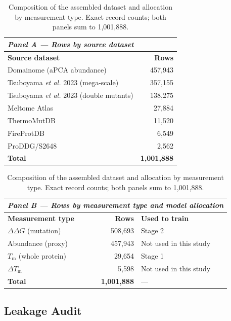 \documentclass[journal,article,submit,moreauthors]{Definitions/mdpi}
\newcommand{\ddg}{\ensuremath{\Delta\Delta G}}
\newcommand{\Tm}{\ensuremath{T_\mathrm{m}}}
\newcommand{\dtm}{\ensuremath{\Delta T_\mathrm{m}}}
\begin{document}
\begin{table}[H]
\caption{Composition of the assembled dataset and allocation by measurement type. Exact
record counts; both panels sum to 1{,}001{,}888.}
\label{tab:data}
\begin{tabular}{lr}
\toprule
\multicolumn{2}{l}{\textit{Panel A --- Rows by source dataset}}\\
\midrule
\textbf{Source dataset} & \textbf{Rows}\\
\midrule
Domainome (aPCA abundance)              & 457{,}943\\
Tsuboyama \textit{et al.} 2023 (mega-scale)     & 357{,}155\\
Tsuboyama \textit{et al.} 2023 (double mutants) & 138{,}275\\
Meltome Atlas                           & 27{,}884\\
ThermoMutDB                             & 11{,}520\\
FireProtDB                              & 6{,}549\\
ProDDG/S2648                            & 2{,}562\\
\midrule
\textbf{Total}                          & \textbf{1{,}001{,}888}\\
\bottomrule
\end{tabular}

\vspace{8pt}
\begin{tabular}{lrl}
\toprule
\multicolumn{3}{l}{\textit{Panel B --- Rows by measurement type and model allocation}}\\
\midrule
\textbf{Measurement type} & \textbf{Rows} & \textbf{Used to train}\\
\midrule
\ddg{} (mutation)     & 508{,}693 & Stage 2\\
Abundance (proxy)     & 457{,}943 & Not used in this study\\
\Tm{} (whole protein) & 29{,}654  & Stage 1\\
\dtm{}                & 5{,}598   & Not used in this study\\
\midrule
\textbf{Total}        & \textbf{1{,}001{,}888} & ---\\
\bottomrule
\end{tabular}
\end{table}

\subsection{Leakage Audit}
\label{sec:res-leakage}
\end{document}
